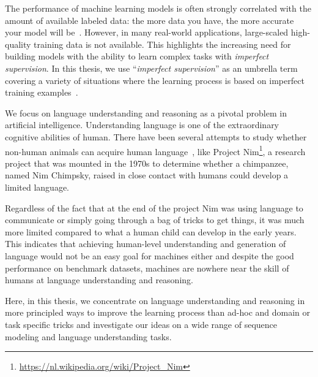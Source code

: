 
The performance of machine learning models is often strongly correlated with the amount of available labeled data:
the more data you have, the more accurate your model will be~\citep{halevy2009unreasonable,sun2017revisiting}.  
However, in many real-world applications, large-scaled high-quality training data is not available.
This highlights the increasing need for building models with the ability to learn complex tasks with \emph{imperfect supervision}. 
In this thesis, we use ``\emph{imperfect supervision}'' as an umbrella term covering a variety of situations where the learning process is based on imperfect training examples~\citep{zhou2018brief}.


We focus on language understanding and reasoning as a pivotal problem in artificial intelligence.  Understanding language is one of the extraordinary cognitive abilities of human. 
There have been several attempts to study whether non-human animals can acquire human language~\citep{pepperberg2017animal}, like Project Nim\footnote{\url{https://nl.wikipedia.org/wiki/Project_Nim}}, a research project that was mounted in the 1970s to determine whether a chimpanzee, named Nim Chimpsky, raised in close contact with humans could develop a limited language. 

Regardless of the fact that at the end of the project Nim was using language to communicate or simply going through a bag of tricks to get things, it was much more limited compared to what a human child can develop in the early years. 
%
This indicates that achieving human-level understanding and generation of language would not be an easy goal for machines either and despite the good performance on benchmark datasets, machines are nowhere near the skill of humans at language understanding and reasoning.

Here, in this thesis, we concentrate on language understanding and reasoning in more principled ways to improve the learning process than ad-hoc and domain or task specific tricks and investigate our ideas on a wide range of sequence modeling and language understanding tasks.

